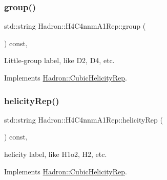 \mbox{\label{structHadron_1_1H4C4nnmA1Rep_a6434db04654db0e72689cb23155ce5c7}} 
\subsubsection{\texorpdfstring{group()}{group()}\hspace{0.1cm}{\footnotesize\ttfamily [5/5]}}
{\footnotesize\ttfamily std\+::string Hadron\+::\+H4\+C4nnm\+A1\+Rep\+::group (\begin{DoxyParamCaption}{ }\end{DoxyParamCaption}) const\hspace{0.3cm}{\ttfamily [inline]}, {\ttfamily [virtual]}}

Little-\/group label, like D2, D4, etc. 

Implements \mbox{\hyperlink{structHadron_1_1CubicHelicityRep_a101a7d76cd8ccdad0f272db44b766113}{Hadron\+::\+Cubic\+Helicity\+Rep}}.

\mbox{\label{structHadron_1_1H4C4nnmA1Rep_a9693ffed8dcfde2846c4cf56c107f88c}} 
\subsubsection{\texorpdfstring{helicityRep()}{helicityRep()}\hspace{0.1cm}{\footnotesize\ttfamily [1/3]}}
{\footnotesize\ttfamily std\+::string Hadron\+::\+H4\+C4nnm\+A1\+Rep\+::helicity\+Rep (\begin{DoxyParamCaption}{ }\end{DoxyParamCaption}) const\hspace{0.3cm}{\ttfamily [inline]}, {\ttfamily [virtual]}}

helicity label, like H1o2, H2, etc. 

Implements \mbox{\hyperlink{structHadron_1_1CubicHelicityRep_af1096946b7470edf0a55451cc662f231}{Hadron\+::\+Cubic\+Helicity\+Rep}}.

\mbox{\label{structHadron_1_1H4C4nnmA1Rep_a9693ffed8dcfde2846c4cf56c107f88c}} 
